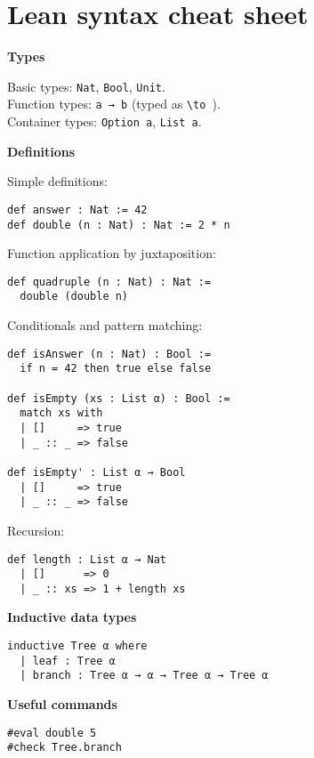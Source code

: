 \documentclass[11pt,DIV=16,parskip=half,headings=normal,abstract]{scrartcl}
\newcommand{\li}{\lstinline}
\begin{document}
\thispagestyle{empty}

\section*{Lean syntax cheat sheet}

\setlength\columnsep{5mm}
\begin{multicols*}{2}
\raggedright
\raggedcolumns

\textbf{Types}

Basic types: \li{Nat}, \li{Bool}, \li{Unit}.\\
Function types: \li{a → b} (typed as \li{\to }).\\
Container types: \li{Option a}, \li{List a}.

\textbf{Definitions}

Simple definitions:
\begin{lstlisting}
def answer : Nat := 42
def double (n : Nat) : Nat := 2 * n
\end{lstlisting}

Function application by juxtaposition:
\begin{lstlisting}
def quadruple (n : Nat) : Nat :=
  double (double n)
\end{lstlisting}

Conditionals and pattern matching:
\begin{lstlisting}
def isAnswer (n : Nat) : Bool :=
  if n = 42 then true else false

def isEmpty (xs : List α) : Bool :=
  match xs with
  | []     => true
  | _ :: _ => false

def isEmpty' : List α → Bool
  | []     => true
  | _ :: _ => false
\end{lstlisting}

Recursion:
\begin{lstlisting}
def length : List α → Nat
  | []      => 0
  | _ :: xs => 1 + length xs
\end{lstlisting}

\textbf{Inductive data types}

\begin{lstlisting}
inductive Tree α where
  | leaf : Tree α
  | branch : Tree α → α → Tree α → Tree α
\end{lstlisting}

\textbf{Useful commands}
\begin{lstlisting}
#eval double 5
#check Tree.branch
\end{lstlisting}


\end{multicols*}
\end{document}
